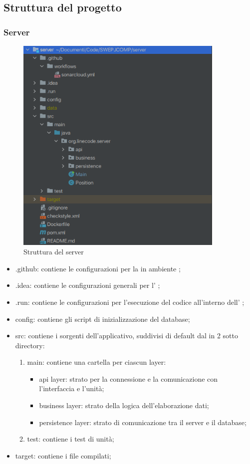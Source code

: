 \subsection{Struttura del progetto}
	\subsubsection{Server}

	\begin{figure}[H]
		\centering
		\includegraphics[width=10cm]{img/struttura_server.png}
		\caption{Struttura del server}
	\end{figure}

	\begin{itemize}
		\item{.github}: contiene le configurazioni per la  in ambiente ;
		\item{.idea}: contiene le configurazioni generali per l' ;
		\item{.run}: contiene le configurazioni per l'esecuzione del codice all'interno	dell' ;
		\item{config}: contiene gli script di inizializzazione del database;
		\item{src}: contiene i sorgenti dell'applicativo, suddivisi di default dal  in 2 sotto	directory:
		\begin{enumerate}
			\item{main}: contiene una cartella per ciascun layer:
				\begin{itemize}
					\item{api layer}: strato per la connessione e la comunicazione con l'interfaccia e l'unità;
					\item{business layer}: strato della logica dell'elaborazione dati;
					\item{persistence layer}: strato di comunicazione tra il server e il database;
				\end{itemize}
			\item{test}: contiene i test di unità;
		\end{enumerate}
		\item{target}: contiene i file compilati;
	\end{itemize}

